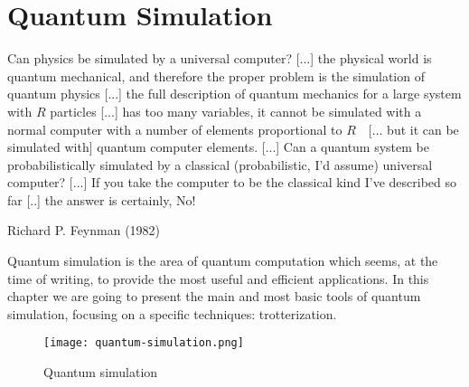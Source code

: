 \chapter{Quantum Simulation}\label{chap:2}
\epigraph{Can physics be simulated by a universal computer? [...] the physical world is quantum mechanical, and therefore the proper problem is the simulation of quantum physics [...] the full description of quantum mechanics for a large system with $R$ particles [...] has too many variables, it cannot be simulated with a normal computer with a number of elements proportional to $R \quad[\ldots$ but it can be simulated with] quantum computer elements. [...] Can a quantum system be probabilistically simulated by a classical (probabilistic, I'd assume) universal computer? [...] If you take the computer to be the classical kind I've described so far [..] the answer is certainly, No!}{Richard P. Feynman (1982)}
Quantum simulation is the area of quantum computation which seems, at the time of writing, to provide the most useful and efficient applications. In this chapter we are going to present the main and most basic tools of quantum simulation, focusing on a specific techniques: trotterization. 

\begin{figure}[htb]
\texttt{[image: quantum-simulation.png]}
\centering
\caption{Quantum simulation \cite{UQC}}
\end{figure}

    




